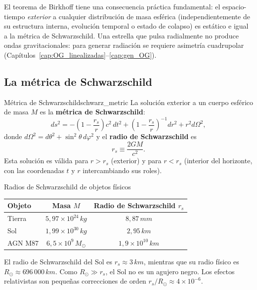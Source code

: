 \begin{importante}
El teorema de Birkhoff tiene una consecuencia práctica fundamental: el espacio-tiempo \emph{exterior} a cualquier distribución de masa esférica (independientemente de su estructura interna, evolución temporal o estado de colapso) es estático e igual a la métrica de Schwarzschild. Una estrella que pulsa radialmente no produce ondas gravitacionales: para generar radiación se requiere asimetría cuadrupolar (Capítulos~\ref{cap:OG_linealizadas}--\ref{cap:gen_OG}).
\end{importante}

\subsection{La métrica de Schwarzschild}

\begin{definicion}{Métrica de Schwarzschild}{schwarz_metric}
La solución exterior a un cuerpo esférico de masa $M$ es la \textbf{métrica de Schwarzschild}:
\begin{equation}
  \boxed{ds^2 = -\!\left(1 - \frac{r_s}{r}\right)c^2\,dt^2
  + \left(1 - \frac{r_s}{r}\right)^{-1}dr^2
  + r^2 d\Omega^2,}
  \label{eq:schwarz}
\end{equation}
donde $d\Omega^2 = d\theta^2 + \sin^2\!\theta\,d\varphi^2$ y el \textbf{radio de Schwarzschild} es
\begin{equation}
  r_s \equiv \frac{2GM}{c^2}.
  \label{eq:radio_schwarz}
\end{equation}
Esta solución es válida para $r > r_s$ (exterior) y para $r < r_s$ (interior del horizonte, con las coordenadas $t$ y $r$ intercambiando sus roles).
\end{definicion}

\begin{ejemplo}{Radios de Schwarzschild de objetos físicos}{}
\begin{center}
\begin{tabular}{lcc}
\hline
Objeto & Masa $M$ & Radio de Schwarzschild $r_s$ \\
\hline
Tierra & $5{,}97\times10^{24}\,\si{kg}$ & $8{,}87\,\si{mm}$ \\
Sol & $1{,}99\times10^{30}\,\si{kg}$ & $2{,}95\,\si{km}$ \\
AGN M87 & $6{,}5\times10^9\,M_\odot$ & $1{,}9\times10^{10}\,\si{km}$ \\
\hline
\end{tabular}
\end{center}
El radio de Schwarzschild del Sol es $r_s \approx 3\,\si{km}$, mientras que su radio físico es $R_\odot \approx 696\,000\,\si{km}$. Como $R_\odot \gg r_s$, el Sol no es un agujero negro. Los efectos relativistas son pequeñas correcciones de orden $r_s/R_\odot \approx 4\times10^{-6}$.
\end{ejemplo}

